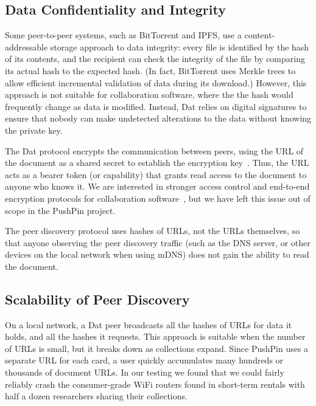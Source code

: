 \documentclass[sigplan,10pt]{acmart}
\begin{document}
\subsection{Data Confidentiality and Integrity}

Some peer-to-peer systems, such as BitTorrent and IPFS, use a content-addressable storage approach to data integrity: every file is identified by the hash of its contents, and the recipient can check the integrity of the file by comparing its actual hash to the expected hash.
(In fact, BitTorrent uses Merkle trees \cite{Merkle:1987} to allow efficient incremental validation of data during its download.)
However, this approach is not suitable for collaboration software, where the the hash would frequently change as data is modified.
Instead, Dat relies on digital signatures to ensure that nobody can make undetected alterations to the data without knowing the private key.

The Dat protocol encrypts the communication between peers, using the URL of the document as a shared secret to establish the encryption key~\cite{HowDatWorks}.
Thus, the URL acts as a bearer token (or capability) that grants read access to the document to anyone who knows it.
We are interested in stronger access control and end-to-end encryption protocols for collaboration software~\cite{Kleppmann:2018tk}, but we have left this issue out of scope in the PushPin project.

The peer discovery protocol uses hashes of URLs, not the URLs themselves, so that anyone observing the peer discovery traffic (such as the DNS server, or other devices on the local network when using mDNS) does not gain the ability to read the document.

\subsection{Scalability of Peer Discovery}


On a local network, a Dat peer broadcasts all the hashes of URLs for data it holds, and all the hashes it requests.
This approach is suitable when the number of URLs is small, but it breaks down as collections expand.
Since PushPin uses a separate URL for each card, a user quickly accumulates many hundreds or thousands of document URLs.
In our testing we found that we could fairly reliably crash the consumer-grade WiFi routers found in short-term rentals with half a dozen researchers sharing their collections.
\end{document}
